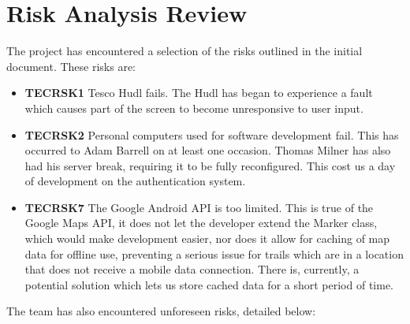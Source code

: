\documentclass[11pt,a4paper]{article}
\begin{document}
\section{Risk Analysis Review}
\label{sec:risks}
The project has encountered a selection of the risks outlined in the initial document. These risks are:
\begin{itemize}
\item\textbf{TECRSK1} Tesco Hudl fails. The Hudl has began to experience a fault which causes part of the screen to become unresponsive to user input.
\item\textbf{TECRSK2} Personal computers used for software development fail. This has occurred to Adam Barrell on at least one occasion. Thomas Milner has also had his server break, requiring it to be fully reconfigured. This cost us a day of development on the authentication system.
\item\textbf{TECRSK7} The Google Android API is too limited. This is true of the Google Maps API, it does not let the developer extend the Marker class, which would make development easier, nor does it allow for caching of map data for offline use, preventing a serious issue for trails which are in a location that does not receive a mobile data connection. There is, currently, a potential solution which lets us store cached data for a short period of time.
\end{itemize}
The team has also encountered unforeseen risks, detailed below:
\end{document}
